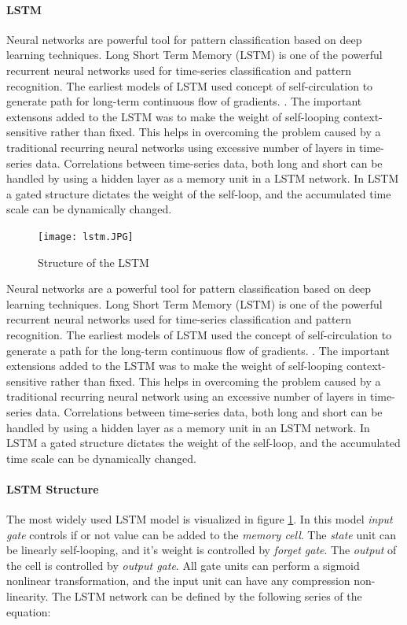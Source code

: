 \paragraph{LSTM} Neural networks are powerful tool for pattern classification based on deep learning techniques. Long Short Term Memory (LSTM) is one of the powerful recurrent neural networks used for time-series classification and pattern recognition. The earliest models of LSTM used concept of self-circulation to generate path for long-term continuous flow of gradients. \cite{long_short_hochreiter}. The important extensons added to the LSTM was to make the weight of self-looping context-sensitive rather than fixed. This helps in overcoming the problem caused by a traditional recurring neural networks using excessive number of layers in time-series data. Correlations between time-series data, both long and short can be handled by using a hidden layer as a memory unit in a LSTM network. In LSTM a gated structure dictates the weight of the self-loop, and the accumulated time scale can be dynamically changed.

\begin{figure}
    \centering
    \texttt{[image: lstm.JPG]}
    \caption{Structure of the LSTM}
    \label{fig:lstm_structure}
\end{figure}
 Neural networks are a powerful tool for pattern classification based on deep learning techniques. Long Short Term Memory (LSTM) is one of the powerful recurrent neural networks used for time-series classification and pattern recognition. The earliest models of LSTM used the concept of self-circulation to generate a path for the long-term continuous flow of gradients. \cite{long_short_hochreiter}. The important extensions added to the LSTM was to make the weight of self-looping context-sensitive rather than fixed. This helps in overcoming the problem caused by a traditional recurring neural network using an excessive number of layers in time-series data. Correlations between time-series data, both long and short can be handled by using a hidden layer as a memory unit in an LSTM network. In LSTM a gated structure dictates the weight of the self-loop, and the accumulated time scale can be dynamically changed.
 
\paragraph{LSTM Structure} The most widely used LSTM model is visualized in figure \ref{fig:lstm_structure}. In this model \textit{input gate} controls if or not value can be added to the \textit{memory cell}. The \textit{state} unit can be linearly self-looping, and it's weight is controlled by \textit{forget gate}. The \textit{output} of the cell is controlled by \textit{output gate}. All gate units can perform a sigmoid nonlinear transformation, and the input unit can have any compression non-linearity. The LSTM network can be defined by the following series of the equation:

